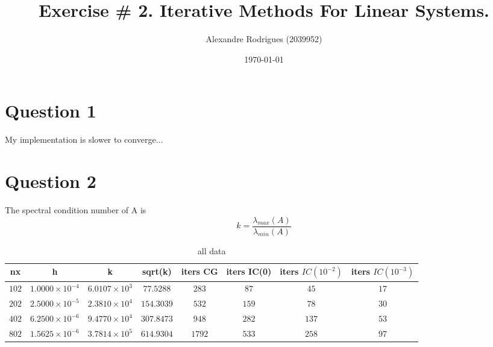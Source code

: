 \documentclass[a4paper, 11pt]{article}
\begin{document}
	
	\title{Exercise \# 2. Iterative Methods For Linear Systems. }
	\author{{\small Alexandre Rodrigues (2039952)}}
	\date{\today}
	
	\maketitle
		\section*{Question 1}
		My implementation is slower to converge...
		
		
		
		
		\section*{Question 2}
		
		
		The spectral condition number of A is 
		\begin{equation}
			k = \frac{\lambda_{max}(A)}{\lambda_{min}(A)}
		\end{equation}
	
		\begin{table}[H]
			\centering
			\begin{tabular}{c|c|c|c|c|c|c|c}
				\textbf{nx} & \textbf{h} 			& \textbf{k} 			 & \textbf{sqrt(k)}	& \textbf{iters CG} & \textbf{iters IC(0)} & \textbf{iters $IC(10^{-2})$} & \textbf{iters $IC(10^{-3})$} \\ \hline
				$ 102 $ & $ 1.0000 \times 10^{-4} $ & $ 6.0107 \times 10^3 $ & $ 77.5288 $ 		& $ 283 $ & $ 87 $ & $ 45 $ & $ 17 $ \\ \hline
				$ 202 $ & $ 2.5000 \times 10^{-5} $ & $ 2.3810 \times 10^4 $ & $ 154.3039 $ 	& $ 532 $ & $ 159 $ & $ 78 $ & $ 30 $ \\ \hline
				$ 402 $ & $ 6.2500 \times 10^{-6} $ & $ 9.4770 \times 10^4 $ & $ 307.8473 $ 	& $ 948 $ & $ 282 $ & $ 137 $ & $ 53 $\\ \hline
				$ 802 $ & $ 1.5625 \times 10^{-6} $ & $ 3.7814 \times 10^5 $ & $ 614.9304 $ 	& $ 1792 $& $ 533 $ & $ 258 $ & $ 97 $ \\ \hline
			\end{tabular}
			\caption{all data}
			\label{table:ex2}
		\end{table}	
	
\end{document}
